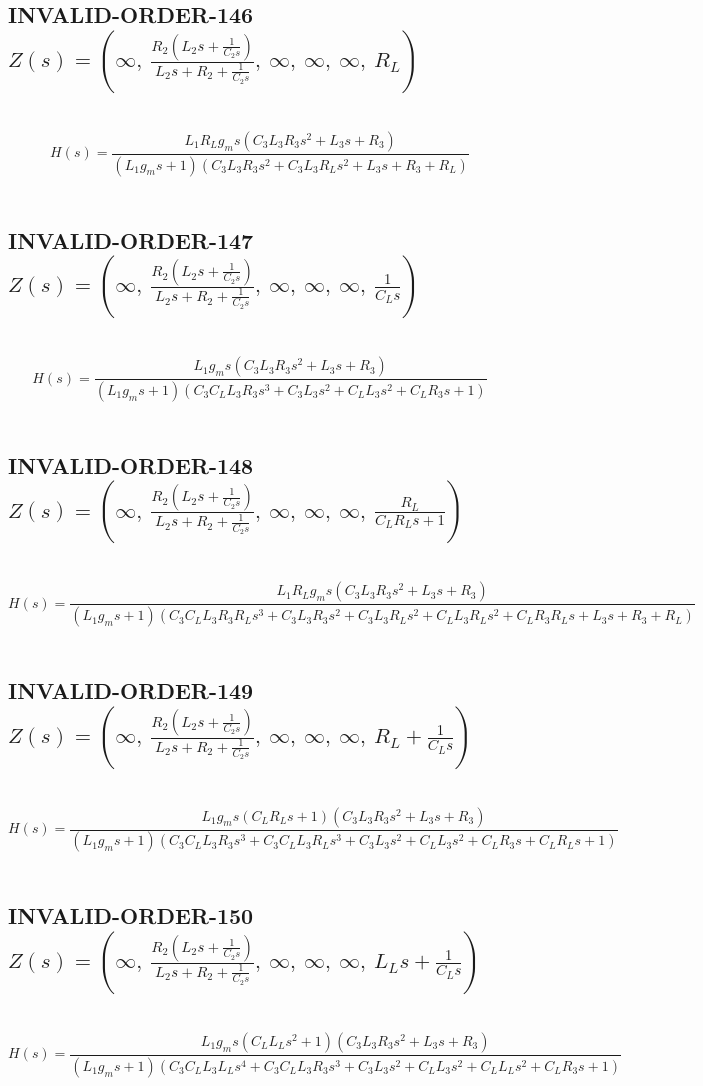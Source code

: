 \documentclass{article}
\begin{document}
\subsection{INVALID-ORDER-146 $Z(s) = \left( \infty, \  \frac{R_{2} \left(L_{2} s + \frac{1}{C_{2} s}\right)}{L_{2} s + R_{2} + \frac{1}{C_{2} s}}, \  \infty, \  \infty, \  \infty, \  R_{L}\right)$ } \ 
\textbf{\[H(s) = \frac{L_{1} R_{L} g_{m} s \left(C_{3} L_{3} R_{3} s^{2} + L_{3} s + R_{3}\right)}{\left(L_{1} g_{m} s + 1\right) \left(C_{3} L_{3} R_{3} s^{2} + C_{3} L_{3} R_{L} s^{2} + L_{3} s + R_{3} + R_{L}\right)}\] } \ 
\subsection{INVALID-ORDER-147 $Z(s) = \left( \infty, \  \frac{R_{2} \left(L_{2} s + \frac{1}{C_{2} s}\right)}{L_{2} s + R_{2} + \frac{1}{C_{2} s}}, \  \infty, \  \infty, \  \infty, \  \frac{1}{C_{L} s}\right)$ } \ 
\textbf{\[H(s) = \frac{L_{1} g_{m} s \left(C_{3} L_{3} R_{3} s^{2} + L_{3} s + R_{3}\right)}{\left(L_{1} g_{m} s + 1\right) \left(C_{3} C_{L} L_{3} R_{3} s^{3} + C_{3} L_{3} s^{2} + C_{L} L_{3} s^{2} + C_{L} R_{3} s + 1\right)}\] } \ 
\subsection{INVALID-ORDER-148 $Z(s) = \left( \infty, \  \frac{R_{2} \left(L_{2} s + \frac{1}{C_{2} s}\right)}{L_{2} s + R_{2} + \frac{1}{C_{2} s}}, \  \infty, \  \infty, \  \infty, \  \frac{R_{L}}{C_{L} R_{L} s + 1}\right)$ } \ 
\textbf{\[H(s) = \frac{L_{1} R_{L} g_{m} s \left(C_{3} L_{3} R_{3} s^{2} + L_{3} s + R_{3}\right)}{\left(L_{1} g_{m} s + 1\right) \left(C_{3} C_{L} L_{3} R_{3} R_{L} s^{3} + C_{3} L_{3} R_{3} s^{2} + C_{3} L_{3} R_{L} s^{2} + C_{L} L_{3} R_{L} s^{2} + C_{L} R_{3} R_{L} s + L_{3} s + R_{3} + R_{L}\right)}\] } \ 
\subsection{INVALID-ORDER-149 $Z(s) = \left( \infty, \  \frac{R_{2} \left(L_{2} s + \frac{1}{C_{2} s}\right)}{L_{2} s + R_{2} + \frac{1}{C_{2} s}}, \  \infty, \  \infty, \  \infty, \  R_{L} + \frac{1}{C_{L} s}\right)$ } \ 
\textbf{\[H(s) = \frac{L_{1} g_{m} s \left(C_{L} R_{L} s + 1\right) \left(C_{3} L_{3} R_{3} s^{2} + L_{3} s + R_{3}\right)}{\left(L_{1} g_{m} s + 1\right) \left(C_{3} C_{L} L_{3} R_{3} s^{3} + C_{3} C_{L} L_{3} R_{L} s^{3} + C_{3} L_{3} s^{2} + C_{L} L_{3} s^{2} + C_{L} R_{3} s + C_{L} R_{L} s + 1\right)}\] } \ 
\subsection{INVALID-ORDER-150 $Z(s) = \left( \infty, \  \frac{R_{2} \left(L_{2} s + \frac{1}{C_{2} s}\right)}{L_{2} s + R_{2} + \frac{1}{C_{2} s}}, \  \infty, \  \infty, \  \infty, \  L_{L} s + \frac{1}{C_{L} s}\right)$ } \ 
\textbf{\[H(s) = \frac{L_{1} g_{m} s \left(C_{L} L_{L} s^{2} + 1\right) \left(C_{3} L_{3} R_{3} s^{2} + L_{3} s + R_{3}\right)}{\left(L_{1} g_{m} s + 1\right) \left(C_{3} C_{L} L_{3} L_{L} s^{4} + C_{3} C_{L} L_{3} R_{3} s^{3} + C_{3} L_{3} s^{2} + C_{L} L_{3} s^{2} + C_{L} L_{L} s^{2} + C_{L} R_{3} s + 1\right)}\] } \ 
\end{document}
